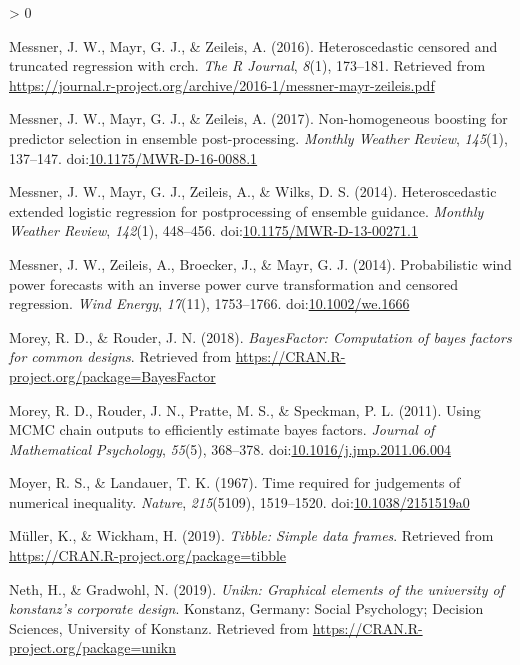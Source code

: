 \documentclass[
  english,
  doc,floatsintext]{apa6}
\newlength{\cslhangindent}
\newenvironment{CSLReferences}[2] %
 {%
  \setlength{\parindent}{0pt}
  \ifodd #1 \everypar{\setlength{\hangindent}{\cslhangindent}}\ignorespaces\fi
  \ifnum #2 > 0
  \setlength{\parskip}{#2\baselineskip}
  \fi
 }%
 {}
\begin{document}
\begin{CSLReferences}{1}{0}
\leavevmode\hypertarget{ref-R-crch_a}{}%
Messner, J. W., Mayr, G. J., \& Zeileis, A. (2016). Heteroscedastic censored and truncated regression with {crch}. \emph{The R Journal}, \emph{8}(1), 173--181. Retrieved from \url{https://journal.r-project.org/archive/2016-1/messner-mayr-zeileis.pdf}

\leavevmode\hypertarget{ref-R-crch_b}{}%
Messner, J. W., Mayr, G. J., \& Zeileis, A. (2017). Non-homogeneous boosting for predictor selection in ensemble post-processing. \emph{Monthly Weather Review}, \emph{145}(1), 137--147. doi:\href{https://doi.org/10.1175/MWR-D-16-0088.1}{10.1175/MWR-D-16-0088.1}

\leavevmode\hypertarget{ref-R-crch_d}{}%
Messner, J. W., Mayr, G. J., Zeileis, A., \& Wilks, D. S. (2014). Heteroscedastic extended logistic regression for postprocessing of ensemble guidance. \emph{Monthly Weather Review}, \emph{142}(1), 448--456. doi:\href{https://doi.org/10.1175/MWR-D-13-00271.1}{10.1175/MWR-D-13-00271.1}

\leavevmode\hypertarget{ref-R-crch_c}{}%
Messner, J. W., Zeileis, A., Broecker, J., \& Mayr, G. J. (2014). Probabilistic wind power forecasts with an inverse power curve transformation and censored regression. \emph{Wind Energy}, \emph{17}(11), 1753--1766. doi:\href{https://doi.org/10.1002/we.1666}{10.1002/we.1666}

\leavevmode\hypertarget{ref-R-BayesFactor}{}%
Morey, R. D., \& Rouder, J. N. (2018). \emph{BayesFactor: Computation of bayes factors for common designs}. Retrieved from \url{https://CRAN.R-project.org/package=BayesFactor}

\leavevmode\hypertarget{ref-morey2011using}{}%
Morey, R. D., Rouder, J. N., Pratte, M. S., \& Speckman, P. L. (2011). Using MCMC chain outputs to efficiently estimate bayes factors. \emph{Journal of Mathematical Psychology}, \emph{55}(5), 368--378. doi:\href{https://doi.org/10.1016/j.jmp.2011.06.004}{10.1016/j.jmp.2011.06.004}

\leavevmode\hypertarget{ref-moyer1967time}{}%
Moyer, R. S., \& Landauer, T. K. (1967). Time required for judgements of numerical inequality. \emph{Nature}, \emph{215}(5109), 1519--1520. doi:\href{https://doi.org/10.1038/2151519a0}{10.1038/2151519a0}

\leavevmode\hypertarget{ref-R-tibble}{}%
Müller, K., \& Wickham, H. (2019). \emph{Tibble: Simple data frames}. Retrieved from \url{https://CRAN.R-project.org/package=tibble}

\leavevmode\hypertarget{ref-R-unikn}{}%
Neth, H., \& Gradwohl, N. (2019). \emph{Unikn: Graphical elements of the university of konstanz's corporate design}. Konstanz, Germany: Social Psychology; Decision Sciences, University of Konstanz. Retrieved from \url{https://CRAN.R-project.org/package=unikn}


\end{CSLReferences}
\end{document}
